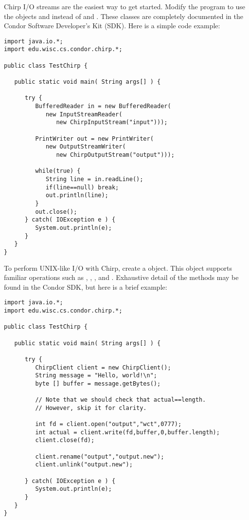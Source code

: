 Chirp I/O streams are the easiest way to get started.
Modify the program to use the objects 
and  instead of  and
.
These classes are completely documented
in the Condor Software Developer's Kit (SDK).
Here is a simple code example:

\begin{verbatim}
import java.io.*;
import edu.wisc.cs.condor.chirp.*;

public class TestChirp {

   public static void main( String args[] ) {

      try {
         BufferedReader in = new BufferedReader(
            new InputStreamReader(
               new ChirpInputStream("input")));

         PrintWriter out = new PrintWriter(
            new OutputStreamWriter(
               new ChirpOutputStream("output")));

         while(true) {
            String line = in.readLine();
            if(line==null) break;
            out.println(line);
         }
         out.close();
      } catch( IOException e ) {
         System.out.println(e);
      }
   }
}
\end{verbatim}

To perform UNIX-like I/O with Chirp,
create a  object.
This object supports familiar operations such as , ,
, and .
Exhaustive detail of the methods may be found in the Condor 
SDK, but here is a brief example:

\begin{verbatim}
import java.io.*;
import edu.wisc.cs.condor.chirp.*;

public class TestChirp {

   public static void main( String args[] ) {

      try {
         ChirpClient client = new ChirpClient();
         String message = "Hello, world!\n";
         byte [] buffer = message.getBytes();

         // Note that we should check that actual==length.
         // However, skip it for clarity.

         int fd = client.open("output","wct",0777);
         int actual = client.write(fd,buffer,0,buffer.length);
         client.close(fd);

         client.rename("output","output.new");
         client.unlink("output.new");

      } catch( IOException e ) {
         System.out.println(e);
      }
   }
}
\end{verbatim}

